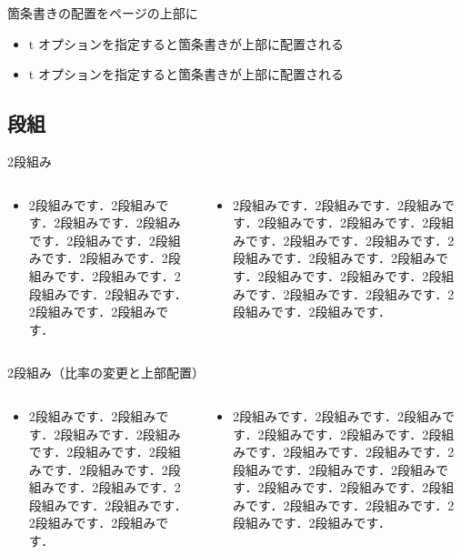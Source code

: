 \begin{frame}[t]{箇条書きの配置をページの上部に}
  \begin{itemize}
    \item t オプションを指定すると箇条書きが上部に配置される
    \item t オプションを指定すると箇条書きが上部に配置される
  \end{itemize}
\end{frame}

\subsection{段組}

\begin{frame}{2段組み}
  \begin{columns}
    \begin{column}{0.5\textwidth}
      \begin{itemize}
        \item 2段組みです．2段組みです．2段組みです．2段組みです．2段組みです．2段組みです．2段組みです．2段組みです．2段組みです．2段組みです．2段組みです．2段組みです．2段組みです．
      \end{itemize}
    \end{column}
    \begin{column}{0.5\textwidth}
      \begin{itemize}
        \item 2段組みです．2段組みです．2段組みです．2段組みです．2段組みです．2段組みです．2段組みです．2段組みです．2段組みです．2段組みです．2段組みです．2段組みです．2段組みです．2段組みです．2段組みです．2段組みです．2段組みです．2段組みです．
      \end{itemize}
    \end{column}
  \end{columns}
\end{frame}

\begin{frame}{2段組み（比率の変更と上部配置）}
  \begin{columns}[t]
    \begin{column}{0.3\textwidth}
      \begin{itemize}
        \item 2段組みです．2段組みです．2段組みです．2段組みです．2段組みです．2段組みです．2段組みです．2段組みです．2段組みです．2段組みです．2段組みです．2段組みです．2段組みです．
      \end{itemize}
    \end{column}
    \begin{column}{0.7\textwidth}
      \begin{itemize}
        \item 2段組みです．2段組みです．2段組みです．2段組みです．2段組みです．2段組みです．2段組みです．2段組みです．2段組みです．2段組みです．2段組みです．2段組みです．2段組みです．2段組みです．2段組みです．2段組みです．2段組みです．2段組みです．
      \end{itemize}
    \end{column}
  \end{columns}
\end{frame}

